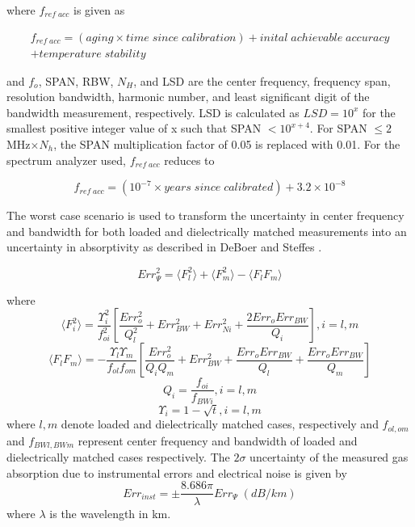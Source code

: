 \noindent where $f_{ref\;acc}$ is given as

\begin{equation}\label{eq:frefacclong}
\begin{split}
f_{ref\;acc} = (aging \times {time\;since\;calibration}) + {inital\;achievable\;accuracy} \\
+ {temperature\;stability}
\end{split}
\end{equation}

\noindent and $f_o$, SPAN, RBW, $N_H$, and LSD are the center frequency, frequency span, resolution bandwidth, harmonic number, and least significant digit of the bandwidth measurement, respectively. LSD is calculated as $LSD = 10^x$ for the smallest positive integer value of x such that SPAN $< 10^{x+4}$. For SPAN $\leq 2$ MHz$\times N_h$, the SPAN multiplication factor of 0.05 is replaced with 0.01. For the spectrum analyzer used, $f_{ref\;acc}$ reduces to

\begin{equation}\label{eq:frefacc}
f_{ref\;acc} = (10^{-7} \times {years\;since\;calibrated}) + 3.2\times 10^{-8}
\end{equation}

The worst case scenario is used to transform the uncertainty in center frequency and bandwidth for both loaded and dielectrically matched measurements into an uncertainty in absorptivity as described in DeBoer and Steffes \cite{DeBoer-Steffes}.

\begin{equation}
Err^2_\Psi = \langle {F_l^2}\rangle + \langle {F_m^2}\rangle -\langle {F_l F_m}\rangle
\end{equation}

\noindent where
\begin{equation}
\langle {F_i^2}\rangle = \frac{\Upsilon_i^2}{f_{oi}^2}
\left[ \frac{Err_o^2}{Q_l^2} + Err_{BW}^2 + Err_{Ni}^2 + \frac{2Err_o Err_{BW}}{Q_i} \right], i= l,m
\end{equation}
\begin{equation}
\langle {F_l F_m}\rangle = -\frac{\Upsilon_l \Upsilon_m}{f_{ol} f_{om}}
\left[ \frac{Err_o^2}{Q_i Q_m} + Err_{BW}^2 + \frac{Err_o Err_{BW}}{Q_l} + \frac{Err_o Err_{BW}}{Q_m}\right]
\end{equation}
\begin{equation}
Q_i = \frac{f_{oi}}{f_{BWi}}, i = l,m
\end{equation}
\begin{equation}
\Upsilon_i = 1- \sqrt{t}, i = l,m
\end{equation}
where $l,m$ denote loaded and dielectrically matched cases, respectively and $f_{ol,om}$ and $f_{BWl,BWm}$ represent center frequency and bandwidth of loaded and dielectrically matched cases respectively. The $2\sigma$ uncertainty of the measured gas absorption due to instrumental errors and electrical noise is given by
\begin{equation}
Err_{inst} = \pm \frac{8.686\pi}{\lambda}Err_\Psi\;(dB/km)
\end{equation}
where $\lambda$ is the wavelength in km. 

